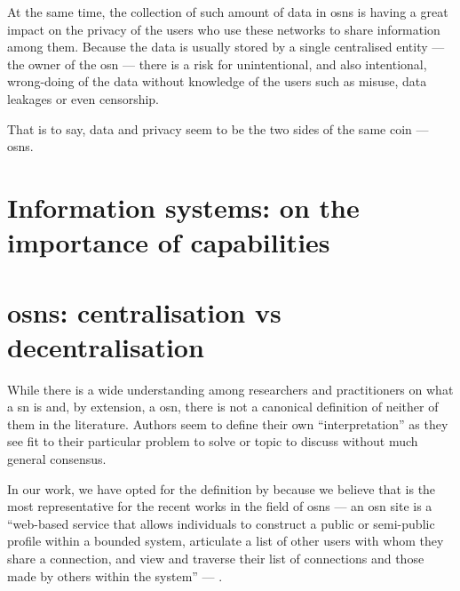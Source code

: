 \documentclass[showtrims]{kthesis}
\begin{document}
At the same time, the collection of such amount of data in \acp{osn} is having a great 
impact on the privacy of the users who use these networks to share information among 
them. Because the data is usually stored by a single centralised entity --- the 
owner of the \ac{osn} --- there is a risk for unintentional, and also intentional, 
wrong-doing of the data without knowledge of the users such as misuse, data leakages 
or even censorship.

That is to say, data and privacy seem to be the two sides of the same coin --- \acp{osn}. 



\section{Information systems: on the importance of capabilities}


\section{\Aclp{osn}: centralisation vs decentralisation}

While there is a wide understanding among researchers and practitioners on what 
a \ac{sn} is and, by extension, a \ac{osn}, there is not a canonical definition 
of neither of them in the literature. Authors seem to define their own ``interpretation'' 
as they see fit to their particular problem to solve or topic to discuss without 
much general consensus.

In our work, we have opted for the definition by \citeauthor{boydE07} because we 
believe that is the most representative for the recent works in the field of \acp{osn} 
--- an \ac{osn} site is a ``web-based service that allows individuals to construct 
a public or semi-public profile within a bounded system, articulate a list of other 
users with whom they share a connection, and view and traverse their list of connections 
and those made by others within the system'' --- \cite{boydE07}. 
\end{document}
